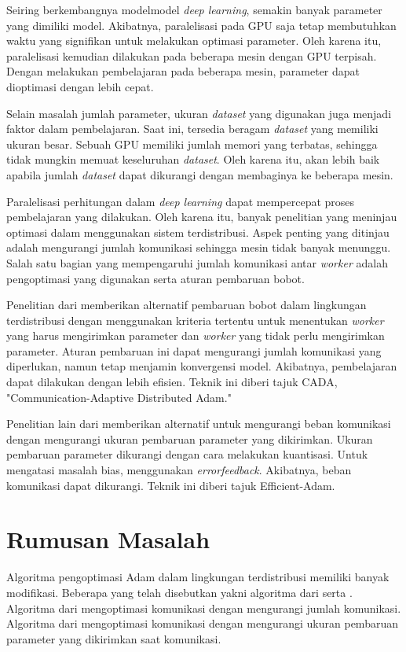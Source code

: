Seiring berkembangnya model\+model \emph{deep learning}, semakin banyak parameter yang dimiliki model. Akibatnya, paralelisasi pada GPU saja tetap membutuhkan waktu yang signifikan untuk melakukan optimasi parameter. Oleh karena itu, paralelisasi kemudian dilakukan pada beberapa mesin dengan GPU terpisah. Dengan melakukan pembelajaran pada beberapa mesin, parameter dapat dioptimasi dengan lebih cepat.

Selain masalah jumlah parameter, ukuran \emph{dataset} yang digunakan juga menjadi faktor dalam pembelajaran. Saat ini, tersedia beragam \emph{dataset} yang memiliki ukuran besar. Sebuah GPU memiliki jumlah memori yang terbatas, sehingga tidak mungkin memuat keseluruhan \emph{dataset}. Oleh karena itu, akan lebih baik apabila jumlah \emph{dataset} dapat dikurangi dengan membaginya ke beberapa mesin.

Paralelisasi perhitungan dalam \emph{deep learning} dapat mempercepat proses pembelajaran yang dilakukan. Oleh karena itu, banyak penelitian yang meninjau optimasi dalam menggunakan sistem terdistribusi. Aspek penting yang ditinjau adalah mengurangi jumlah komunikasi sehingga mesin tidak banyak menunggu. Salah satu bagian yang mempengaruhi jumlah komunikasi antar \emph{worker} adalah pengoptimasi yang digunakan serta aturan pembaruan bobot.

Penelitian dari \textcite{Chen2021CADA} memberikan alternatif pembaruan bobot dalam lingkungan terdistribusi dengan menggunakan kriteria tertentu untuk menentukan \emph{worker} yang harus mengirimkan parameter dan \emph{worker} yang tidak perlu mengirimkan parameter. Aturan pembaruan ini dapat mengurangi jumlah komunikasi yang diperlukan, namun tetap menjamin konvergensi model. Akibatnya, pembelajaran dapat dilakukan dengan lebih efisien. Teknik ini diberi tajuk CADA, "Communication-Adaptive Distributed Adam."

Penelitian lain dari \textcite{Chen2022Efficient} memberikan alternatif untuk mengurangi beban komunikasi dengan mengurangi ukuran pembaruan parameter yang dikirimkan. Ukuran pembaruan parameter dikurangi dengan cara melakukan kuantisasi. Untuk mengatasi masalah bias, \textcite{Chen2022Efficient} menggunakan \emph{error\+feedback}. Akibatnya, beban komunikasi dapat dikurangi. Teknik ini diberi tajuk Efficient-Adam.

\section{Rumusan Masalah}
Algoritma pengoptimasi Adam dalam lingkungan terdistribusi memiliki banyak modifikasi. Beberapa yang telah disebutkan yakni algoritma dari \textcite{Chen2021CADA} serta \textcite{Chen2022Efficient}. Algoritma dari \textcite{Chen2021CADA} mengoptimasi komunikasi dengan mengurangi jumlah komunikasi. Algoritma dari \textcite{Chen2022Efficient} mengoptimasi komunikasi dengan mengurangi ukuran pembaruan parameter yang dikirimkan saat komunikasi.

